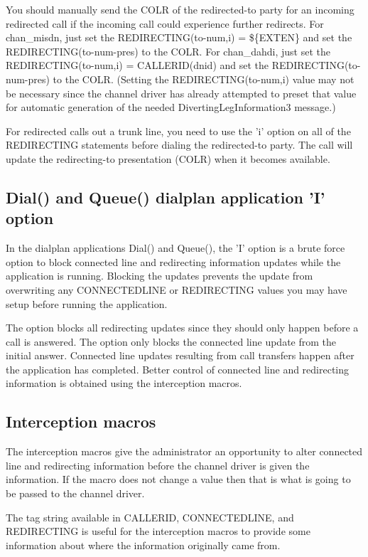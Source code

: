 You should manually send the COLR of the redirected-to party for an
incoming redirected call if the incoming call could experience further
redirects.  For chan_misdn, just set the REDIRECTING(to-num,i) =
\$\{EXTEN\} and set the REDIRECTING(to-num-pres) to the COLR.  For
chan_dahdi, just set the REDIRECTING(to-num,i) = CALLERID(dnid) and set
the REDIRECTING(to-num-pres) to the COLR.  (Setting the
REDIRECTING(to-num,i) value may not be necessary since the channel driver
has already attempted to preset that value for automatic generation of the
needed DivertingLegInformation3 message.)

For redirected calls out a trunk line, you need to use the 'i' option on
all of the REDIRECTING statements before dialing the redirected-to party.
The call will update the redirecting-to presentation (COLR) when it
becomes available.

\subsection{Dial() and Queue() dialplan application 'I' option}

In the dialplan applications Dial() and Queue(), the 'I' option is a brute
force option to block connected line and redirecting information updates
while the application is running.  Blocking the updates prevents the
update from overwriting any CONNECTEDLINE or REDIRECTING values you may
have setup before running the application.

The option blocks all redirecting updates since they should only happen
before a call is answered.  The option only blocks the connected line
update from the initial answer.  Connected line updates resulting from
call transfers happen after the application has completed.  Better control
of connected line and redirecting information is obtained using the
interception macros.

\subsection{Interception macros}

The interception macros give the administrator an opportunity to alter
connected line and redirecting information before the channel driver is
given the information.  If the macro does not change a value then that is
what is going to be passed to the channel driver.

The tag string available in CALLERID, CONNECTEDLINE, and REDIRECTING is
useful for the interception macros to provide some information about where
the information originally came from.

